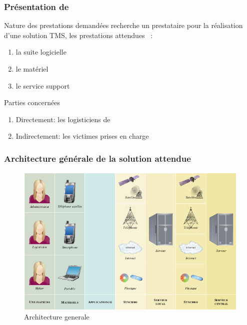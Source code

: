  \begin{frame}
 \frametitle {Présentation de \mo}
 \begin{block}{Nature des prestations demandées}
 \mo recherche  un prestataire pour la réalisation d'une solution TMS, les prestations attendues ~:
 \begin{enumerate}
 \item la suite logicielle \pause
 \item le matériel \pause
 \item le service support
 \end{enumerate}
 \end{block} \pause
 \begin{block}{Parties concernées}
 \begin{enumerate}
 \item Directement: les logisticiens de \mo
 \item Indirectement: les victimes prises en charge
 \end{enumerate}
 \end{block}
 \end{frame}
 
 \begin{frame}
 \frametitle {Architecture générale de la solution attendue}
 \begin{figure}[htbp]
	  \centering
	  \includegraphics[scale=0.4]{Images/architecture.png}
	  \caption{Architecture generale}
  \end{figure}
 \end{frame}
